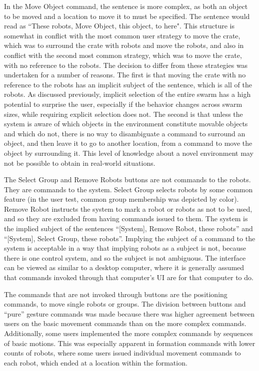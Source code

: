 In the Move Object command, the sentence is more complex, as both an object to be moved and a location to move it to must be specified. 
The sentence would read as ``These robots, Move Object, this object, to here". 
This structure is somewhat in conflict with the most common user strategy to move the crate, which was to surround the crate with robots and move the robots, and also in conflict with the second most common strategy, which was to move the crate, with no reference to the robots. 
The decision to differ from these strategies was undertaken for a number of reasons. 
The first is that moving the crate with no reference to the robots has an implicit subject of the sentence, which is all of the robots. 
As discussed previously, implicit selection of the entire swarm has a high potential to surprise the user, especially if the behavior changes across swarm sizes, while requiring explicit selection does not. 
The second is that unless the system is aware of which objects in the environment constitute movable objects and which do not, there is no way to disambiguate a command to surround an object, and then leave it to go to another location, from a command to move the object by surrounding it.
This level of knowledge about a novel environment may not be possible to obtain in real-world situations. 

The Select Group and Remove Robots buttons are not commands to the robots. 
They are commands to the system. 
Select Group selects robots by some common feature (in the user test, common group membership was depicted by color). 
Remove Robot instructs the system to mark a robot or robots as not to be used, and so they are excluded from having commands issued to them. 
The system is the implied subject of the sentences ``[System], Remove Robot, these robots'' and ``[System], Select Group, these robots''. 
Implying the subject of a command to the system is acceptable in a way that implying robots as a subject is not, because there is one control system, and so the subject is not ambiguous. 
The interface can be viewed as similar to a desktop computer, where it is generally assumed that commands invoked through that computer's UI are for that computer to do. 

The commands that are not invoked through buttons are the positioning commands, to move single robots or groups. 
The division between buttons and ``pure'' gesture commands was made because there was higher agreement between users on the basic movement commands than on the more complex commands. 
Additionally, some users implemented the more complex commands by sequences of basic motions. 
This was especially apparent in formation commands with lower counts of robots, where some users issued individual movement commands to each robot, which ended at a location within the formation. 

